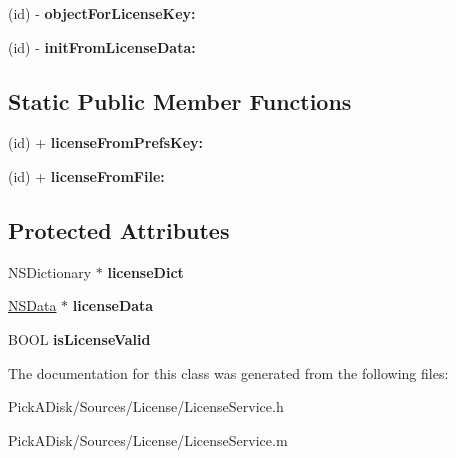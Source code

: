 \begin{DoxyCompactItemize}
\item 
\hypertarget{interface_p_a_d_license_af99981d019270afb55674e7e9de6afef}{
(id) -\/ {\bfseries objectForLicenseKey:}}
\label{interface_p_a_d_license_af99981d019270afb55674e7e9de6afef}

\item 
\hypertarget{interface_p_a_d_license_a74c3a49b807a0fae9a72a68fed24fcdb}{
(id) -\/ {\bfseries initFromLicenseData:}}
\label{interface_p_a_d_license_a74c3a49b807a0fae9a72a68fed24fcdb}

\end{DoxyCompactItemize}
\subsection*{Static Public Member Functions}
\begin{DoxyCompactItemize}
\item 
\hypertarget{interface_p_a_d_license_aa7bbaacf312d742c186c757352097938}{
(id) + {\bfseries licenseFromPrefsKey:}}
\label{interface_p_a_d_license_aa7bbaacf312d742c186c757352097938}

\item 
\hypertarget{interface_p_a_d_license_aa7b393222f5985d7ee6c8bc6e4e472bf}{
(id) + {\bfseries licenseFromFile:}}
\label{interface_p_a_d_license_aa7b393222f5985d7ee6c8bc6e4e472bf}

\end{DoxyCompactItemize}
\subsection*{Protected Attributes}
\begin{DoxyCompactItemize}
\item 
\hypertarget{interface_p_a_d_license_a09e90d5c2ab9be1d3b3db08ca63b439a}{
NSDictionary $\ast$ {\bfseries licenseDict}}
\label{interface_p_a_d_license_a09e90d5c2ab9be1d3b3db08ca63b439a}

\item 
\hypertarget{interface_p_a_d_license_a74bf870bcbbe8d357352649717828392}{
\hyperlink{class_n_s_data}{NSData} $\ast$ {\bfseries licenseData}}
\label{interface_p_a_d_license_a74bf870bcbbe8d357352649717828392}

\item 
\hypertarget{interface_p_a_d_license_a5096f7db194aa3c158ab9d5e78d8ab49}{
BOOL {\bfseries isLicenseValid}}
\label{interface_p_a_d_license_a5096f7db194aa3c158ab9d5e78d8ab49}

\end{DoxyCompactItemize}


The documentation for this class was generated from the following files:\begin{DoxyCompactItemize}
\item 
PickADisk/Sources/License/LicenseService.h\item 
PickADisk/Sources/License/LicenseService.m\end{DoxyCompactItemize}
